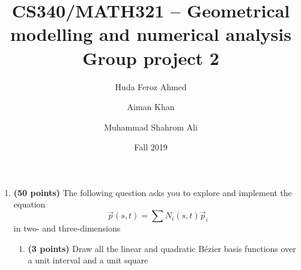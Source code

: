 \documentclass[a4paper, 11pt]{article}
\title{CS340/MATH321 -- Geometrical modelling and numerical analysis \\ Group project 2}
\date{Fall 2019}
\author{Huda Feroz Ahmed \and Aiman Khan \and Muhammad Shahrom Ali}
\begin{document}
\maketitle  
\setlength{\parskip}{10pt}
\setlength{\parindent}{0pt}

\begin{enumerate}
    
\item \textbf{(50 points)} The following question asks you to explore and implement the equation \[\vec p(s, t) = \sum N_i(s, t) \vec p_i\] in two- and three-dimensions

\begin{enumerate}[label=\alph*.]
    \item \textbf{(3 points)} Draw all the linear and quadratic B\'{e}zier basis functions over a unit interval and a unit square

\end{enumerate}
\end{enumerate}
\end{document}
